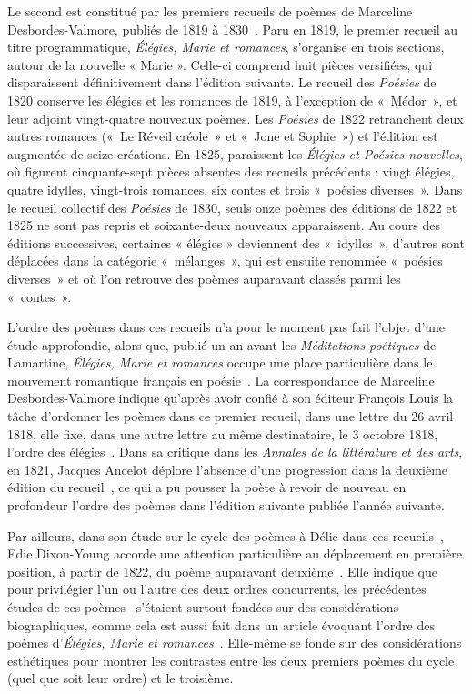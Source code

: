 \documentclass[final, fra]{anthology-ch}     %
\begin{document}
Le second est constitué par les premiers recueils de poèmes de Marceline Desbordes-Valmore, publiés de 1819 à 1830~\cite{Desbordes1819,DesbordesValmore1820,DesbordesValmore1822,DesbordesValmore1825,DesbordesValmore1830}. 
Paru en 1819, le premier recueil au titre programmatique, \emph{Élégies, Marie et romances}, s’organise en trois sections, autour de la nouvelle « Marie ». Celle-ci comprend huit pièces versifiées, qui disparaissent définitivement dans l’édition suivante. Le recueil des \emph{Poésies} de 1820 conserve les élégies et les romances de 1819, à l'exception de «~Médor~», et leur adjoint vingt-quatre nouveaux poèmes. Les \emph{Poésies} de 1822 retranchent deux autres romances («~Le Réveil créole~» et «~Jone et Sophie~») et l’édition est augmentée de seize créations. En 1825, paraissent les \emph{Élégies et Poésies nouvelles}, où figurent cinquante-sept pièces absentes des recueils précédents : vingt élégies, quatre idylles, vingt-trois romances, six contes et trois «~poésies diverses~». Dans le recueil collectif des \emph{Poésies} de 1830, seuls onze poèmes des éditions de 1822 et 1825 ne sont pas repris et soixante-deux nouveaux apparaissent. Au cours des éditions successives, certaines « élégies » deviennent des «~idylles~», d’autres sont déplacées dans la catégorie «~mélanges~», qui est ensuite renommée «~poésies diverses~» et où l’on retrouve des poèmes auparavant classés parmi les «~contes~». 

L'ordre des poèmes dans ces recueils n'a pour le moment pas fait l'objet d'une étude approfondie, alors que, publié un an avant les \emph{Méditations poétiques} de Lamartine, %
\emph{{\'E}légies, Marie et romances} occupe une place particulière dans le mouvement romantique français en poésie~\cite{Newkirk1954,Plante2011}. La correspondance de Marceline Desbordes-Valmore indique qu'après avoir confié à son éditeur François Louis la tâche d'ordonner les poèmes dans ce premier recueil, dans une lettre du 26 avril 1818, elle fixe, dans une autre lettre au même destinataire, le 3 octobre 1818, l'ordre des élégies~\cite{Cavallucci1936}.
Dans sa critique dans les \emph{Annales de la littérature et des arts}, en 1821, Jacques Ancelot déplore l'absence d'une progression dans la deuxième édition du recueil~\cite{Ancelot1821}, ce qui a pu pousser la poète à revoir de nouveau en profondeur l'ordre des poèmes dans l'édition suivante publiée l'année suivante.

Par ailleurs, dans son étude sur le cycle des poèmes à Délie dans ces recueils~\cite{DixonYoung2025}, Edie Dixon-Young accorde une attention particulière au déplacement en première position, à partir de 1822, du poème auparavant deuxième~\cite{DixonYoung2025}. Elle indique que pour privilégier l'un ou l'autre des deux ordres concurrents, les précédentes études de ces poèmes~\cite{Bertrand1973,Ambriere1987} s'étaient surtout fondées sur des considérations biographiques, comme cela est aussi fait dans un article évoquant l'ordre des poèmes d'\emph{{\'E}légies, Marie et romances}~\cite{Michel2010}. Elle-même se fonde sur des considérations esthétiques pour montrer les contrastes entre les deux premiers poèmes du cycle (quel que soit leur ordre) et le troisième.
\end{document}

